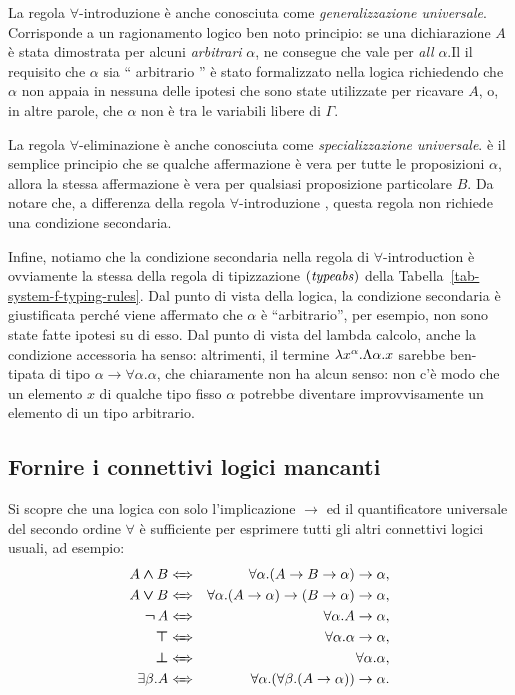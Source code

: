 \documentclass{article}
\begin{document}
La regola $\forall$-introduzione \`e anche conosciuta come {\em generalizzazione 
	universale}. Corrisponde a un ragionamento logico ben noto
principio: se una dichiarazione $A$  \`e stata dimostrata per alcuni {\em arbitrari}
$\alpha$, ne consegue che vale per {\em all} $\alpha$.Il
il requisito che $\alpha$ sia `` arbitrario '' \`e stato formalizzato nella
logica richiedendo che $\alpha$ non appaia in nessuna delle
ipotesi che sono state utilizzate per ricavare $A$, o, in altre parole, che
$\alpha$ non \`e tra le variabili libere di $\Gamma$.

La regola $\forall$-eliminazione \`e anche conosciuta come {\em specializzazione 
	universale}.  \`e il semplice principio che se qualche affermazione
\`e vera per tutte le proposizioni $\alpha$, allora la stessa affermazione \`e vera per
qualsiasi proposizione particolare $B$. Da notare che, a differenza della regola $\forall$-introduzione
, questa regola non richiede una condizione secondaria. 

Infine, notiamo che la condizione secondaria nella regola di $\forall$-introduction
\`e ovviamente la stessa della regola di tipizzazione $\textrm{(\textit{typeabs\/})}$ della
Tabella~\ref{tab-system-f-typing-rules}. Dal punto di vista della logica, 
la condizione secondaria \`e giustificata perch\'e viene affermato che
$\alpha$ \`e ``arbitrario'', per esempio, non sono state fatte ipotesi su di esso. 
Dal punto di vista del lambda calcolo, anche la condizione accessoria ha senso:
altrimenti, il termine $\lambda x^{\alpha}.\Lambda\alpha.x$ sarebbe
ben-tipata di tipo $\alpha\to\forall\alpha.\alpha$, che chiaramente non 
ha alcun senso: non c'\`e modo che un elemento $x$ di qualche tipo
fisso $\alpha$ potrebbe diventare improvvisamente un elemento di un tipo arbitrario. 

\subsection{Fornire i connettivi logici mancanti}

Si scopre che una logica con solo l'implicazione  $\to$ ed
il quantificatore universale del secondo ordine  $\forall$ \`e sufficiente per
esprimere tutti gli altri connettivi logici usuali, ad esempio:
\begin{eqnarray}
A\cand B &\iff& \forall\alpha.(A\to B\to\alpha)\to\alpha,\label{eqn-A-cand-B}\\
A\cor B &\iff& \forall\alpha.(A\to\alpha)\to(B\to\alpha)\to\alpha,\label{eqn-A-cor-B}\\
\cnot A &\iff& \forall\alpha.A\to \alpha,\\
\ctrue &\iff& \forall\alpha.\alpha\to\alpha,\\
\cfalse &\iff& \forall\alpha.\alpha,\\
\exists\beta.A &\iff& \forall\alpha.(\forall\beta.(A\to\alpha))\to\alpha.\label{eqn-exists-beta-A}
\end{eqnarray}
\end{document}
